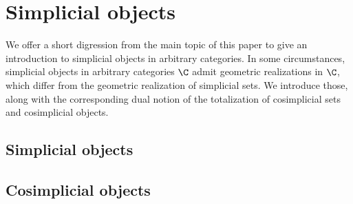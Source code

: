 \section{Simplicial objects}\label{sec5}

We offer a short digression from the main topic of this paper to give an introduction to simplicial objects in arbitrary categories. In some circumstances, simplicial objects in arbitrary categories $\C$ admit geometric realizations in $\C$, which differ from the geometric realization of simplicial sets. We introduce those, along with the corresponding dual notion of the totalization of cosimplicial sets and cosimplicial objects.

\subsection{Simplicial objects}\label{sec4.1}

\subsection{Cosimplicial objects}\label{sec4.2}
